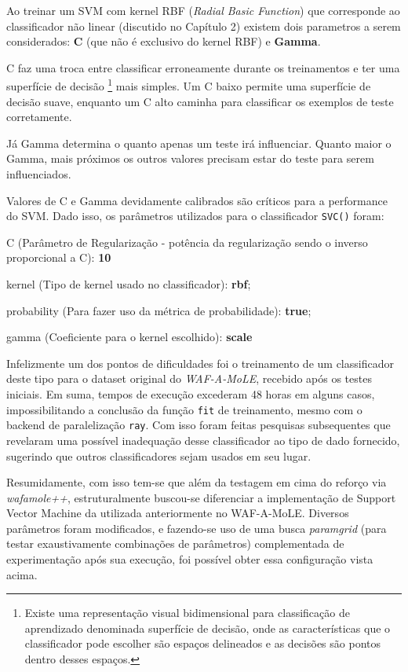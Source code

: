 Ao treinar um SVM com kernel RBF (\textit{Radial Basic Function}) que corresponde ao classificador não linear (discutido no Capítulo 2) existem dois parametros a serem considerados: \textbf{C} (que não é exclusivo do kernel RBF) e \textbf{Gamma}.

C faz uma troca entre classificar erroneamente durante os treinamentos e ter uma superfície de decisão \footnote{Existe uma representação visual bidimensional para classificação de aprendizado denominada superfície de decisão, onde as características que o classificador pode escolher são espaços delineados e as decisões são pontos dentro desses espaços.} mais simples. Um C baixo permite uma superfície de decisão suave, enquanto um C alto caminha para classificar os exemplos de teste corretamente. 

Já Gamma determina o quanto apenas um teste irá influenciar. Quanto maior o Gamma, mais próximos os outros valores precisam estar do teste para serem influenciados.

Valores de C e Gamma devidamente calibrados são críticos para a performance do SVM. Dado isso, os parâmetros utilizados para o classificador \verb+SVC()+ foram:
\begin{alineas}
    \item C (Parâmetro de Regularização - potência da regularização sendo o inverso proporcional a C): \textbf{10} 
    \item kernel (Tipo de kernel usado no classificador): \textbf{rbf};
    \item probability (Para fazer uso da métrica de probabilidade): \textbf{true};
    \item gamma (Coeficiente para o kernel escolhido): \textbf{scale}
\end{alineas}

\bigskip

Infelizmente um dos pontos de dificuldades foi o treinamento de um classificador deste tipo para o dataset original do \textit{WAF-A-MoLE}, recebido após os testes iniciais. Em suma, tempos de execução excederam 48 horas em alguns casos, impossibilitando a conclusão da função \verb+fit+ de treinamento, mesmo com o backend de paralelização \verb+ray+.  Com isso foram feitas pesquisas subsequentes que revelaram uma possível inadequação desse classificador ao tipo de dado fornecido, sugerindo que outros classificadores sejam usados em seu lugar.

Resumidamente, com isso tem-se que além da testagem em cima do reforço via \textit{wafamole++}, estruturalmente buscou-se diferenciar a implementação de Support Vector Machine da utilizada anteriormente no WAF-A-MoLE. Diversos parâmetros foram modificados, e fazendo-se uso de uma busca \textit{paramgrid} (para testar exaustivamente combinações de parâmetros) complementada de experimentação após sua execução, foi possível obter essa configuração vista acima. 

